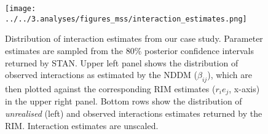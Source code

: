 \documentclass[a4,12pt]{article}
\begin{document}
    \begin{figure}[H]
        \texttt{[image: ../../3.analyses/figures\_mss/interaction\_estimates.png]}
        \caption{Distribution of interaction estimates from our case study. Parameter estimates are sampled from the 80\% posterior confidence intervals returned by STAN. Upper left panel shows the distribution of observed interactions as estimated by the NDDM ($\beta_{ij}$), which are then plotted against the corresponding RIM estimates ($r_i e_j$, x-axis) in the upper right panel. Bottom rows show the distribution of \textit{unrealised} (left) and observed interactions estimates returned by the RIM. Interaction estimates are unscaled.}
        \label{fig:adist}
    \end{figure}
\end{document}

